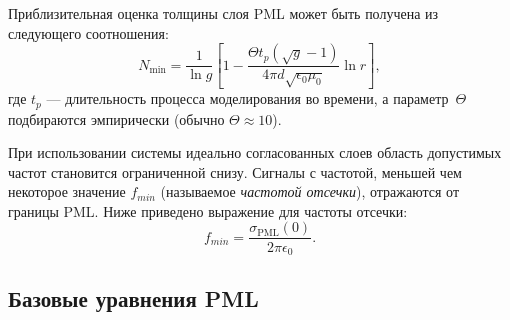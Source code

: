 \noindent
Приблизительная оценка толщины слоя PML может быть получена из следующего
соотношения:
\begin{equation}
\label{eq:hz1}
    N_\text{min}= \frac{1}{\ln g}
    \left[
        1 - \frac{\Theta t_p(\sqrt{g}-1)}{4\pi d \sqrt{\epsilon_0\mu_0}} \ln{r}
    \right],
\end{equation}
где $t_p$ --- длительность процесса моделирования во времени,
а параметр~$\Theta$ подбираются эмпирически (обычно $\Theta\approx10$).

При использовании системы идеально согласованных слоев область допустимых частот
становится ограниченной снизу. Сигналы с частотой, меньшей чем некоторое
значение $f_{min}$ (называемое \emph{частотой отсечки}), отражаются от границы
PML. Ниже приведено выражение для частоты отсечки:
\begin{equation}
    \label{eq:PmlCutoffFrequency}
    f_{min} = \frac{\sigma_\text{PML}(0)}{2\pi\epsilon_0}.
\end{equation}


\subsection{Базовые уравнения PML}

